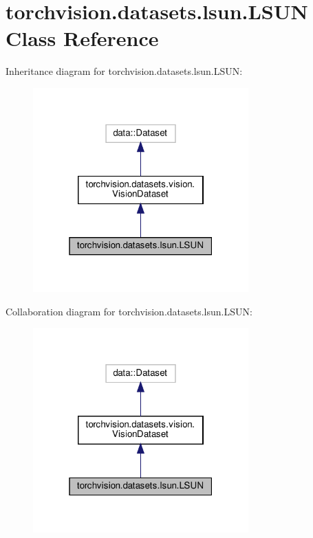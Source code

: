 \hypertarget{classtorchvision_1_1datasets_1_1lsun_1_1LSUN}{}\section{torchvision.\+datasets.\+lsun.\+L\+S\+UN Class Reference}
\label{classtorchvision_1_1datasets_1_1lsun_1_1LSUN}


Inheritance diagram for torchvision.\+datasets.\+lsun.\+L\+S\+UN\+:
\nopagebreak
\begin{figure}[H]
\begin{center}
\leavevmode
\includegraphics[width=235pt]{classtorchvision_1_1datasets_1_1lsun_1_1LSUN__inherit__graph}
\end{center}
\end{figure}


Collaboration diagram for torchvision.\+datasets.\+lsun.\+L\+S\+UN\+:
\nopagebreak
\begin{figure}[H]
\begin{center}
\leavevmode
\includegraphics[width=235pt]{classtorchvision_1_1datasets_1_1lsun_1_1LSUN__coll__graph}
\end{center}
\end{figure}

